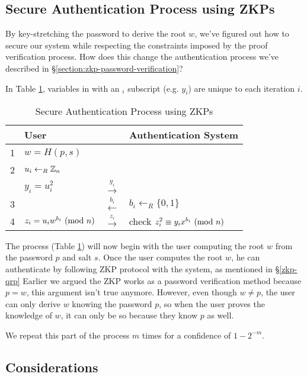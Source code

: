 \subsection{Secure Authentication Process using ZKPs}
By key-stretching the password to derive the root $w$, we've figured out how to secure our system while respecting the constraints imposed by the proof verification process.
How does this change the authentication process we've described in \S\ref{section:zkp-password-verification}?

\bigskip
\noindent
In Table \ref{table:sap-zkp}, variables in with an $_i$ subscript (e.g. $y_i$) are unique to each iteration $i$.

\begin{table}[h!]
	\centering
	\begin{tabular}{p{}|p{}|p{}|p{}}
  		& User & & Authentication System\\
  		\hline
		1 & $w = H(p, s)$ & & \\ 
		\hline
		2 & $u_i \leftarrow_R \Bbb{Z}_{n}$ &  \\
		& $y_i = u_i^2$ & $\xrightarrow{y_i}$ \\
		3 & & $\xleftarrow{b_i}$ & $b_i \leftarrow_R \{0, 1\} $ \\
		4 & $z_i = u_iw^{b_i} \ (\mathrm{mod}\ n) $ & $\xrightarrow{z_i}$ & check $z_i^2 \equiv y_ix^{b_i} \ (\mathrm{mod}\ n)$\\ 
	\end{tabular}
	\caption{Secure Authentication Process using ZKPs}
	\label{table:sap-zkp}
\end{table}

\bigskip
\noindent
The process (Table \ref{table:sap-zkp}) will now begin with the user computing the root $w$ from the password $p$ and salt $s$.
Once the user computes the root $w$, he can authenticate by following ZKP protocol with the system, as mentioned in \S\ref{zkp-qrp}
Earlier we argued the ZKP works as a password verification method because $p = w$, this argument isn't true anymore.
However, even though $w \not = p$, the user can only derive $w$ knowing the password $p$, so when the user proves the knowledge of $w$, it can only be so because they know $p$ as well.

\noindent
We repeat this part of the process $m$ times for a confidence of $1 - 2^{-m}$.
 
\subsection{Considerations}
\label{section:pefromance-considerations}
